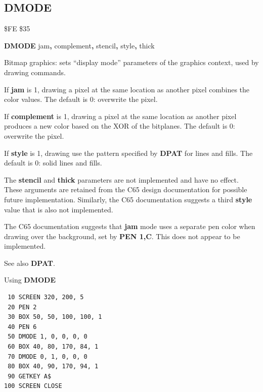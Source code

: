
\newpage
\subsection{DMODE}
\begin{description}[leftmargin=2cm,style=nextline]
\item [Token:]    \$FE \$35
\item [Format:]   {\bf DMODE} jam{\bf,} complement{\bf,} stencil{\bf,} style{\bf,} thick
\item [Usage:]    Bitmap graphics: sets ``display mode'' parameters of the graphics context, used by drawing commands.

                  If {\bf jam} is 1, drawing a pixel at the same location as another pixel combines the color values. The default is 0: overwrite the pixel.

                  If {\bf complement} is 1, drawing a pixel at the same location as another pixel produces a new color based on the XOR of the bitplanes. The default is 0: overwrite the pixel.

                  If {\bf style} is 1, drawing use the pattern specified by {\bf DPAT} for lines and fills. The default is 0: solid lines and fills.

\item[Remarks:]   The {\bf stencil} and {\bf thick} parameters are not implemented and have no effect. These arguments are retained from the C65 design documentation for possible future implementation. Similarly, the C65 documentation suggests a third {\bf style} value that is also not implemented.

                  The C65 documentation suggests that {\bf jam} mode uses a separate pen color when drawing over the background, set by {\bf PEN 1,C}. This does not appear to be implemented.

                  See also {\bf DPAT}.

\item [Example:]  Using {\bf DMODE}

\begin{tcolorbox}[colback=black,coltext=white]
\verbatimfont{\codefont}
\begin{verbatim}
 10 SCREEN 320, 200, 5
 20 PEN 2
 30 BOX 50, 50, 100, 100, 1
 40 PEN 6
 50 DMODE 1, 0, 0, 0, 0
 60 BOX 40, 80, 170, 84, 1
 70 DMODE 0, 1, 0, 0, 0
 80 BOX 40, 90, 170, 94, 1
 90 GETKEY A$
100 SCREEN CLOSE
\end{verbatim}
\end{tcolorbox}
\end{description}

